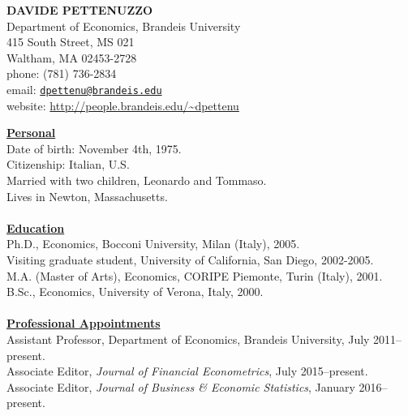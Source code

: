 \documentclass[12pt]{article}
\begin{document}
\begin{center}
\textbf{DAVIDE PETTENUZZO} \\
Department of Economics, Brandeis University \\
415 South Street, MS 021 \\
Waltham, MA 02453-2728 \\
phone: (781) 736-2834 \\
email: \href{mailto:dpettenu@brandeis.edu}{\nolinkurl{dpettenu@brandeis.edu}} \\
website: \url{http://people.brandeis.edu/~dpettenu} \\
\end{center}
\hline 
\bigskip

\underline{\textbf{Personal}}\\
Date of birth: November 4th, 1975. \\
Citizenship: Italian, U.S. \\
Married with two children, Leonardo and Tommaso. \\
Lives in Newton, Massachusetts. \\ \\ 
\underline{\textbf{Education}}\\
Ph.D., Economics, Bocconi University, Milan (Italy), 2005.\\
Visiting graduate student, University of California, San Diego, 2002-2005. \\
M.A. (Master of Arts), Economics, CORIPE Piemonte, Turin (Italy), 2001. \\
B.Sc., Economics, University of Verona, Italy, 2000.\\ \\
\underline{\textbf{Professional Appointments}}\\
Assistant Professor, Department of Economics, Brandeis University, July 2011--present.\\
Associate Editor, \textit{Journal of Financial Econometrics}, July 2015--present. \\
Associate Editor, \textit{Journal of Business \& Economic Statistics}, January 2016--present.
\end{document}
